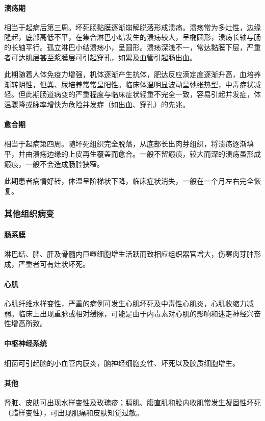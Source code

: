\paragraph{溃疡期}
相当于起病后第三周。坏死肠黏膜逐渐崩解脱落形成溃疡。溃疡常为多灶性，边缘隆起，底部高低不平，在集合淋巴小结发生的溃疡较大，呈椭圆形，溃疡长轴与肠的长轴平行。孤立淋巴小结溃疡小，呈圆形。溃疡深浅不一，常达黏膜下层，严重者可达肌层甚至浆膜层可引起穿孔，如累及血管引起肠出血。

此期随着人体免疫力增强，机体逐渐产生抗体，肥达反应滴定度逐渐升高，血培养渐转阴性，但粪、尿培养常常呈阳性。临床体温明显波动呈弛张热型，中毒症状减轻。但此期肠道病变的严重程度与临床症状轻重不完全一致，容易引起并发症，体温骤降或脉率增快为危险并发症（如出血、穿孔）的先兆。

\paragraph{愈合期}
相当于起病第四周。随坏死组织完全脱落，从底部长出肉芽组织，将溃疡逐渐填平，并由溃疡边缘的上皮再生覆盖而愈合。一般不留瘢痕，较大而深的溃疡虽形成瘢痕，一般不会造成肠腔狭窄。

此期患者病情好转，体温呈阶梯状下降，临床症状消失，一般在一个月左右完全恢复。

\subsubsection{其他组织病变}

\paragraph{肠系膜}
淋巴结、脾、肝及骨髓内巨噬细胞增生活跃而致相应组织器官增大，伤寒肉芽肿形成，严重者可有灶状坏死。

\paragraph{心肌}
心肌纤维水样变性，严重的病例可发生心肌坏死及中毒性心肌炎，心肌收缩力减弱。临床上出现重脉或相对缓脉，可能是由于内毒素对心肌的影响和迷走神经兴奋性增高所致。

\paragraph{中枢神经系统}
细菌可引起脑的小血管内膜炎，脑神经细胞变性、坏死以及胶质细胞增生。

\paragraph{其他}
肾脏、皮肤可出现水样变性及玫瑰疹；膈肌、腹直肌和股内收肌常发生凝固性坏死（蜡样变性），可出现肌痛和皮肤知觉过敏。

